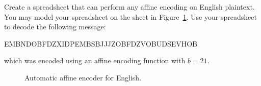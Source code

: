 \begin{exercise}{}
Create a spreadsheet that can perform any affine encoding on English plaintext.  You may model your spreadsheet on the sheet in Figure~\ref{fig:affine}.  Use your spreadsheet to decode the following message:


EMBNDOBFDZXIDPEMBSBJJJZOBFDZVOBUDSEVHOB

which was encoded using an affine encoding function with $b=21$.
\begin{figure}[h]
\caption{Automatic affine encoder for English.}
\label{fig:affine}
\end{figure}
\end{exercise}

